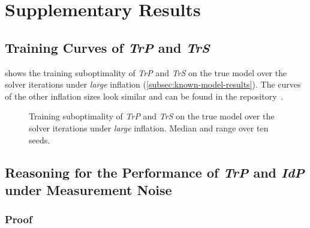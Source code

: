 \chapter{Supplementary Results}
\label{app:supplementary-results}

\section{Training Curves of \emph{TrP} and \emph{TrS}}
\label{sec:app-true-curves}

 shows the training suboptimality of \emph{TrP} and \emph{TrS} on the true model
over the solver iterations under \emph{large} inflation (\cref{subsec:known-model-results}). The curves of the
other inflation sizes look similar and can be found in the repository~\cite{Kranz2026LowDimControl}.

\begin{figure}[htbp]
  \centering
  \caption{Training suboptimality of \emph{TrP} and \emph{TrS} on the true model over the solver iterations
    under \emph{large} inflation. Median and range over ten seeds.}
  \label{fig:app-true-curves}
\end{figure}

\section{Reasoning for the Performance of \emph{TrP} and \emph{IdP} under Measurement Noise}
\label{sec:app-perf-trp-measurement-noise}

\subsection{Proof}
\label{subsec:app-perf-trp-proof}

